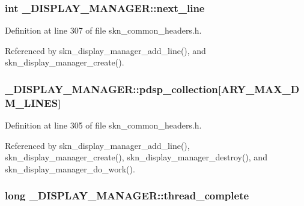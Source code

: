 \subsubsection[{next\+\_\+line}]{\setlength{\rightskip}{0pt plus 5cm}int \+\_\+\+D\+I\+S\+P\+L\+A\+Y\+\_\+\+M\+A\+N\+A\+G\+E\+R\+::next\+\_\+line}\label{struct___d_i_s_p_l_a_y___m_a_n_a_g_e_r_aed299ac3603bba3dfe3c09389122f8d8}


Definition at line 307 of file skn\+\_\+common\+\_\+headers.\+h.



Referenced by skn\+\_\+display\+\_\+manager\+\_\+add\+\_\+line(), and skn\+\_\+display\+\_\+manager\+\_\+create().

\hypertarget{struct___d_i_s_p_l_a_y___m_a_n_a_g_e_r_a3a5ccb906320bd6aecbf89cb6b0fc234}{}
\subsubsection[{pdsp\+\_\+collection}]{ \+\_\+\+D\+I\+S\+P\+L\+A\+Y\+\_\+\+M\+A\+N\+A\+G\+E\+R\+::pdsp\+\_\+collection\mbox{[}{\bf A\+R\+Y\+\_\+\+M\+A\+X\+\_\+\+D\+M\+\_\+\+L\+I\+N\+E\+S}\mbox{]}}\label{struct___d_i_s_p_l_a_y___m_a_n_a_g_e_r_a3a5ccb906320bd6aecbf89cb6b0fc234}


Definition at line 305 of file skn\+\_\+common\+\_\+headers.\+h.



Referenced by skn\+\_\+display\+\_\+manager\+\_\+add\+\_\+line(), skn\+\_\+display\+\_\+manager\+\_\+create(), skn\+\_\+display\+\_\+manager\+\_\+destroy(), and skn\+\_\+display\+\_\+manager\+\_\+do\+\_\+work().

\hypertarget{struct___d_i_s_p_l_a_y___m_a_n_a_g_e_r_ae20e9cf0e6789ce07c5b8005b4a7ada0}{}
\subsubsection[{thread\+\_\+complete}]{\setlength{\rightskip}{0pt plus 5cm}long \+\_\+\+D\+I\+S\+P\+L\+A\+Y\+\_\+\+M\+A\+N\+A\+G\+E\+R\+::thread\+\_\+complete}\label{struct___d_i_s_p_l_a_y___m_a_n_a_g_e_r_ae20e9cf0e6789ce07c5b8005b4a7ada0}


